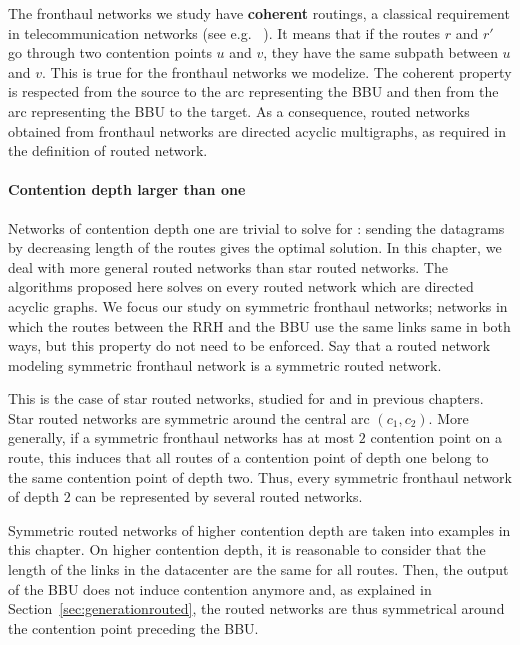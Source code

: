  
The fronthaul networks we study have \textbf{coherent} routings, a classical 
requirement in telecommunication networks (see e.g. ~\cite{schwiebert1996necessary}). It means that
if the routes $r$ and $r'$ go through two contention points $u$ and $v$, they have the same subpath
between $u$ and $v$.
This is true for the fronthaul networks we modelize. The coherent property is respected from the source 
to the arc representing the BBU and then from the arc representing the BBU to the target.
 As a consequence, routed networks obtained from fronthaul networks are directed acyclic multigraphs, as required in the definition of routed network.


\paragraph*{Contention depth larger than one}

Networks of contention depth one are trivial to solve for \spall: sending the datagrams by decreasing length of the routes gives the optimal solution.
In this chapter, we deal with more general routed networks than star routed networks. The algorithms proposed here solves \spall on every routed network which are directed acyclic graphs. We focus our study on symmetric fronthaul networks; networks in which the routes between the RRH and the BBU use the same links same in both ways, but this property do not need to be enforced. Say that a routed network modeling symmetric fronthaul network is a symmetric routed network.

This is the case of star routed networks, studied for \pazl and \pall in previous chapters. Star routed networks are symmetric around the central arc $(c_1,c_2)$. More generally, if a symmetric fronthaul networks has at most $2$ contention point on a route, this induces that all routes of a contention point of depth one belong to the same contention point of depth two. Thus, every symmetric fronthaul network of depth $2$ can be represented by several routed networks.

Symmetric routed networks of higher contention depth are taken into examples in this chapter. On higher contention depth, it is reasonable to consider that the length of the links in the datacenter are the same for all routes. Then, the output of the BBU does not induce contention anymore and, as explained in Section~\ref{sec:generationrouted}, the routed networks are thus symmetrical around the contention point preceding the BBU. 


